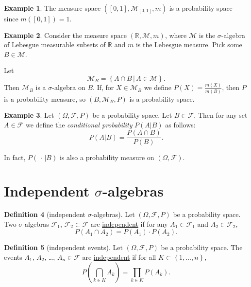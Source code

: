 \documentclass[a4paper,12pt]{scrreprt}
\newcommand{\R}{\mathbb{R}}
\newcommand{\defn}[1]{\ul{#1}}
\theoremstyle{definition}
\newtheorem{definition}{Definition}
\newtheorem{example}[definition]{Example}
\theoremstyle{plain}
\theoremstyle{remark}
\begin{document}
\begin{example}
  The measure space $\left( [0, 1], \mathcal{M}_{[0, 1]}, m \right)$ is a probability space since $m([0, 1]) = 1$.
\end{example}

\begin{example}
  Consider the measure space $(\R, \mathcal{M}, m)$, where $\mathcal{M}$ is the $\sigma$-algebra of Lebesgue measurable subsets of $\R$ and $m$ is the Lebesgue measure. Pick some $B \in \mathcal{M}$.

  Let
  \begin{equation*}
    \mathcal{M}_{B} = \left\{ A \cap B\,\big|\, A \in \mathcal{M} \right\}.
  \end{equation*}
  Then $\mathcal{M}_{B}$ is a $\sigma$-algebra on $B$. If, for $X \in \mathcal{M}_{B}$ we define $P(X) = \frac{m(X)}{m(B)}$, then $P$ is a probability measure, so $(B, \mathcal{M}_{B}, P)$ is a probability space.
\end{example}

\begin{example}
  Let $(\Omega, \mathcal{F}, P)$ be a probability space. Let $B \in \mathcal{F}$. Then for any set $A \in \mathcal{F}$ we define the \emph{conditional probability} $P(A | B)$ as follows:
  \begin{equation*}
    P(A | B) = \frac{P(A \cap B)}{P(B)}.
  \end{equation*}

  In fact, $P(\,\cdot\,|B)$ is also a probability measure on $(\Omega, \mathcal{F})$.
\end{example}

\section{Independent \texorpdfstring{$\sigma$}{Lg}-algebras}

\begin{definition}[independent $\sigma$-algebras]
  \label{def:independentsigmaalgebra}
  Let $(\Omega, \mathcal{F}, P)$ be a probability space. Two $\sigma$-algebras $\mathcal{F}_{1}$, $\mathcal{F}_{2} \subset \mathcal{F}$ are \defn{independent} if for any $A_{1} \in \mathcal{F}_{1}$ and $A_{2} \in \mathcal{F}_{2}$,
  \begin{equation*}
    P(A_{1} \cap A_{2}) = P(A_{1}) \cdot P(A_{2}).
  \end{equation*}
\end{definition}

\begin{definition}[independent events]
  \label{def:independentevents}
  Let $(\Omega, \mathcal{F}, P)$ be a probability space. The events $A_{1}$, $A_{2}$, \dots, $A_{n} \in \mathcal{F}$ are \defn{independent} if for all $K \subset \left\{ 1,\ldots, n \right\}$,
  \begin{equation*}
    P\left( \bigcap_{k \in K} A_{k} \right) = \prod_{k \in K} P(A_{k}).
  \end{equation*}
\end{definition}
\end{document}
